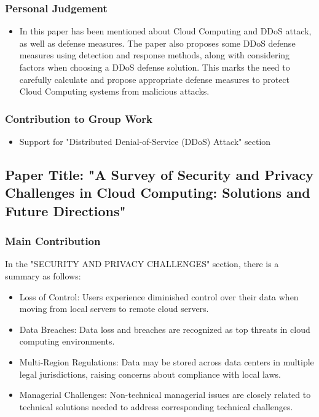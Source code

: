 \documentclass[12pt, twoside]{article}
\begin{document}
\subsubsection{Personal Judgement}
\begin{itemize}
    \item In this paper has been mentioned about Cloud Computing and DDoS attack, as well as defense measures. The paper also proposes some DDoS defense measures using detection and response methods, along with considering factors when choosing a DDoS defense solution. This marks the need to carefully calculate and propose appropriate defense measures to protect Cloud Computing systems from malicious attacks.
\end{itemize}

\subsubsection{Contribution to Group Work}
\begin{itemize}
    \item Support for "Distributed Denial-of-Service (DDoS) Attack" section
\end{itemize}
\subsection{Paper Title: "A Survey of Security and Privacy Challenges in Cloud Computing: Solutions and Future Directions" \cite{liu2015survey}}

\subsubsection{Main Contribution}
In the "SECURITY AND PRIVACY CHALLENGES" section, there is a summary as follows:
\begin{itemize}
    \item Loss of Control: Users experience diminished control over their data when moving from local servers to remote cloud servers.
    \item Data Breaches: Data loss and breaches are recognized as top threats in cloud computing environments.
    \item Multi-Region Regulations: Data may be stored across data centers in multiple legal jurisdictions, raising concerns about compliance with local laws.
    \item Managerial Challenges: Non-technical managerial issues are closely related to technical solutions needed to address corresponding technical challenges.
\end{itemize}
\end{document}
